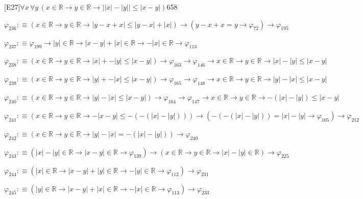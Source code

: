 \begin{fullproof}{[E27]}{$\forall x\,\forall y\,(x \in \mathbb{R} \to y \in \mathbb{R} \to \lvert \lvert x \rvert - \lvert y \rvert \rvert \leq \lvert x - y \rvert)$}{658}
\begin{abbrevlist}
\item $\varphi_{236} :\equiv (x \in \mathbb{R} \to y \in \mathbb{R} \to \lvert y - x + x \rvert \leq \lvert y - x \rvert + \lvert x \rvert) \to (y - x + x = y \to \varphi_{72}) \to \varphi_{195}$
\item $\varphi_{237} :\equiv \varphi_{199} \to \lvert y \rvert \in \mathbb{R} \to \lvert x - y \rvert + \lvert x \rvert \in \mathbb{R} \to -\lvert x \rvert \in \mathbb{R} \to \varphi_{113}$
\item $\varphi_{238} :\equiv (x \in \mathbb{R} \to y \in \mathbb{R} \to \lvert x \rvert + -\lvert y \rvert \leq \lvert x - y \rvert) \to \varphi_{163} \to \varphi_{146} \to x \in \mathbb{R} \to y \in \mathbb{R} \to \lvert x \rvert - \lvert y \rvert \leq \lvert x - y \rvert$
\item $\varphi_{239} :\equiv (x \in \mathbb{R} \to y \in \mathbb{R} \to \lvert y \rvert + -\lvert x \rvert \leq \lvert x - y \rvert) \to \varphi_{165} \to \varphi_{148} \to x \in \mathbb{R} \to y \in \mathbb{R} \to \lvert y \rvert - \lvert x \rvert \leq \lvert x - y \rvert$
\item $\varphi_{240} :\equiv (x \in \mathbb{R} \to y \in \mathbb{R} \to \lvert y \rvert - \lvert x \rvert \leq \lvert x - y \rvert) \to \varphi_{164} \to \varphi_{147} \to x \in \mathbb{R} \to y \in \mathbb{R} \to -(\lvert x \rvert - \lvert y \rvert) \leq \lvert x - y \rvert$
\item $\varphi_{241} :\equiv (x \in \mathbb{R} \to y \in \mathbb{R} \to -\lvert x - y \rvert \leq -(-(\lvert x \rvert - \lvert y \rvert))) \to (-(-(\lvert x \rvert - \lvert y \rvert)) = \lvert x \rvert - \lvert y \rvert \to \varphi_{105}) \to \varphi_{212}$
\item $\varphi_{242} :\equiv (x \in \mathbb{R} \to y \in \mathbb{R} \to \lvert y \rvert - \lvert x \rvert = -(\lvert x \rvert - \lvert y \rvert)) \to \varphi_{240}$
\item $\varphi_{243} :\equiv (\lvert x \rvert - \lvert y \rvert \in \mathbb{R} \to \lvert x - y \rvert \in \mathbb{R} \to \varphi_{139}) \to (x \in \mathbb{R} \to y \in \mathbb{R} \to \lvert x \rvert - \lvert y \rvert \in \mathbb{R}) \to \varphi_{225}$
\item $\varphi_{244} :\equiv (\lvert x \rvert \in \mathbb{R} \to \lvert x - y \rvert + \lvert y \rvert \in \mathbb{R} \to -\lvert y \rvert \in \mathbb{R} \to \varphi_{112}) \to \varphi_{231}$
\item $\varphi_{245} :\equiv (\lvert y \rvert \in \mathbb{R} \to \lvert x - y \rvert + \lvert x \rvert \in \mathbb{R} \to -\lvert x \rvert \in \mathbb{R} \to \varphi_{113}) \to \varphi_{233}$

\end{abbrevlist}
\end{fullproof}
